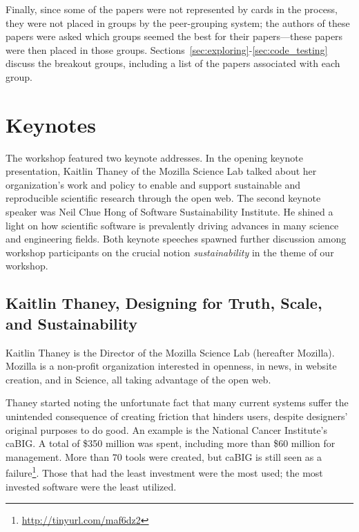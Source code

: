 \documentclass[11pt, oneside]{amsart}
\newcommand{\note}[1]{ {\textcolor{blueish}    { ***Note:      #1 }}}
\begin{document}
Finally, since some of the papers were not represented by cards in the process,
they were not placed in groups by the peer-grouping system; the authors of
these papers were asked which groups seemed the best for their papers---these
papers were then placed in those groups. Sections~\ref{sec:exploring}-\ref{sec:code_testing}
discuss the breakout groups, including a list of the papers associated with each
group.


\section{Keynotes} \label{sec:keynotes}
\begin{comment}
\note{Lead: Choi. \href{http://tinyurl.com/q6ew45v}{Google Notes}.
\href{http://tinyurl.com/mnenzms}{Abstracts and slides}}
\end{comment}

The workshop featured two keynote addresses. In the opening keynote
presentation, Kaitlin Thaney of the Mozilla Science Lab talked about her
organization's work and policy to enable and support sustainable and
reproducible scientific research through the open web. The second keynote
speaker was Neil Chue Hong of Software Sustainability Institute. He shined a
light on how scientific software is prevalently driving advances in many science
and engineering fields. Both keynote speeches spawned further discussion among
workshop participants on the crucial notion \emph{sustainability} in the theme of
our workshop.

\subsection{Kaitlin Thaney, Designing for Truth, Scale, and Sustainability}
\label{keynote1}

Kaitlin Thaney is the Director of the Mozilla Science Lab (hereafter Mozilla).
Mozilla is a non-profit organization interested in openness, in news, in website
creation, and in Science, all taking advantage of the open web.

Thaney started noting the unfortunate fact that many current systems suffer the
unintended consequence of creating friction that hinders users, despite
designers' original purposes to do good. An example is the National Cancer
Institute's caBIG. A total of \$350 million was spent, including more than \$60
million for management. More than $70$ tools were created, but caBIG is still
seen as a failure\footnote{\url{http://tinyurl.com/maf6dz2}}. Those that had the
least investment were the most used; the most invested software were the least
utilized.
\end{document}
